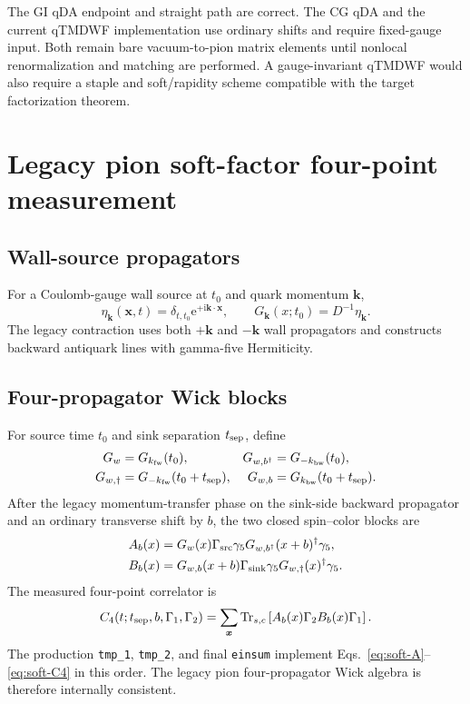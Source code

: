 \documentclass[11pt,a4paper]{article}
\numberwithin{equation}{section}
\newcommand{\ii}{\mathrm{i}}
\newcommand{\ee}{\mathrm{e}}
\newcommand{\Trsc}{\operatorname{Tr}_{s,c}}
\newcommand{\code}[1]{%
  \ifmmode\text{\texttt{\detokenize{#1}}}\else\nolinkurl{#1}\fi}
\begin{document}
The GI qDA endpoint and straight path are correct.  The CG qDA and the current
qTMDWF implementation use ordinary shifts and require fixed-gauge input.
Both remain bare vacuum-to-pion matrix elements until nonlocal
renormalization and matching are performed.  A gauge-invariant qTMDWF would
also require a staple and soft/rapidity scheme compatible with the target
factorization theorem.

\section{Legacy pion soft-factor four-point measurement}

\subsection{Wall-source propagators}

For a Coulomb-gauge wall source at \(t_0\) and quark momentum
\(\boldsymbol k\),
\begin{equation}
 \eta_{\boldsymbol k}(\boldsymbol x,t)
 =\delta_{t,t_0}\ee^{+\ii\boldsymbol k\cdot\boldsymbol x},
\qquad
 G_{\boldsymbol k}(x;t_0)=D^{-1}\eta_{\boldsymbol k}.
 \label{eq:wall-propagator}
\end{equation}
The legacy contraction uses both \(+\boldsymbol k\) and
\(-\boldsymbol k\) wall propagators and constructs backward antiquark lines
with gamma-five Hermiticity.

\subsection{Four-propagator Wick blocks}

For source time \(t_0\) and sink separation \(t_{\rm sep}\), define
\begin{align}
 G_w&=G_{k_{\rm fw}}(t_0),&
 G_{w,b^\dagger}&=G_{-k_{\rm bw}}(t_0),\\
 G_{w,\dagger}&=G_{-k_{\rm fw}}(t_0+t_{\rm sep}),&
 G_{w,b}&=G_{k_{\rm bw}}(t_0+t_{\rm sep}).
\end{align}
After the legacy momentum-transfer phase on the sink-side backward
propagator and an ordinary transverse shift by \(b\), the two closed
spin--color blocks are
\begin{align}
 A_b(x)
 &=G_w(x)\Gamma_{\rm src}\gamma_5
   G_{w,b^\dagger}(x+b)^\dagger\gamma_5,
 \label{eq:soft-A}\\
 B_b(x)
 &=G_{w,b}(x+b)\Gamma_{\rm sink}\gamma_5
   G_{w,\dagger}(x)^\dagger\gamma_5.
 \label{eq:soft-B}
\end{align}
The measured four-point correlator is
\begin{equation}
 C_4(t;t_{\rm sep},b,\Gamma_1,\Gamma_2)
 =\sum_{\boldsymbol x}
 \Trsc\left[
 A_b(x)\Gamma_2B_b(x)\Gamma_1
 \right].
 \label{eq:soft-C4}
\end{equation}
The production \code{tmp_1}, \code{tmp_2}, and final
\code{einsum} implement Eqs.~\eqref{eq:soft-A}--\eqref{eq:soft-C4} in this
order.  The legacy pion four-propagator Wick algebra is therefore
internally consistent.
\end{document}
